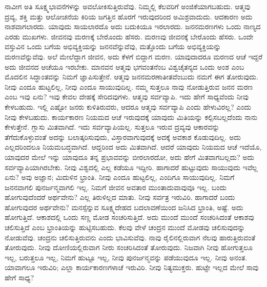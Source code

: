 ನಾವೀಗ ಅತಿ ಸೂಕ್ಷ್ಮಭಾವನೆಗಳನ್ನು ಅವಲೋಕಿಸುತ್ತಿರುವೆವು. ನಿಮ್ಮಲ್ಲಿ ಕೆಲವರಿಗೆ ಅಂಜಿಕೆಯಾಗಬಹುದು. ಆತ್ಮವು ದ್ರವ್ಯ, ಶಕ್ತಿ ಮತ್ತು ಆಲೋಚನೆಯ ಕಿರಿಯ ಜಗತ್ತಿನ ಹೊರಗೆ ಇರುವುದರಿಂದ ಅಮಿಶ್ರವಾದುದು. ಆದಕಾರಣ ಅದು ನಾಶವಾಗಲಾರದು. ಯಾವುದು ಸಾಯಲಾರದೊ ಅದು ಬದುಕಿಯೂ ಇರಲಾರದು. ಜನನಮರಣಗಳು ಒಂದು ನಾಣ್ಯದ ಎರಡು ಮುಖಗಳು. ಜೀವನವು ಮರಣಕ್ಕೆ ಬೇರೊಂದು ಹೆಸರು. ಮರಣವು ಜೀವನಕ್ಕೆ ಬೇರೊಂದು ಹೆಸರು. ಒಂದೇ ವಸ್ತುವಿನ ಒಂದು ಬಗೆಯ ಅಭಿವ್ಯಕ್ತಿಯನ್ನು ಜನನವೆನ್ನುವೆವು, ಮತ್ತೊಂದು ಬಗೆಯ ಅಭಿವ್ಯಕ್ತಿಯನ್ನು ಮರಣವೆನ್ನುವೆವು. ಅಲೆ ಮೇಲೆದ್ದಾಗ ಜೀವನ, ಅದು ಕೆಳಗೆ ಬಿದ್ದಾಗ ಮರಣ. ಯಾವುದಾದರೂ ಮರಣದ ಆಚೆ ಇದ್ದರೆ ಅದು ಜೀವನದ ಆಚೆಯೂ ಇರಬೇಕು. ಮಾನವನ ಆತ್ಮವು ಭಗವಂತನೆಂಬ ವಿಶ್ವಚೈತನ್ಯದ ಒಂದು ಅಂಶ ಎಂಬ ಮೊದಲಿನ ಸಿದ್ಧಾಂತವನ್ನು ನಿಮಗೆ ಜ್ಞಾಪಿಸುತ್ತೇನೆ. ಆತ್ಮವು ಜನನಮರಣಾತೀತವೆಂಬುದು ನಮಗೆ ಈಗ ತೋರುವುದು. ನೀವು ಎಂದೂ ಹುಟ್ಟಲಿಲ್ಲ, ನೀವು ಎಂದೂ ಸಾಯುವುದಿಲ್ಲ. ನಮ್ಮ ಸುತ್ತಲೂ ನಾವು ನೋಡುತ್ತಿರುವ ಜನನ ಮರಣ ಎಂಬ ಇವು ಏನು? ಇವು ಕೇವಲ ದೇಹಕ್ಕೆ ಸೇರಿದವುಗಳು. ಆತ್ಮವು ಸರ್ವವ್ಯಾಪಿ. ಇದು ಹೇಗೆ ಸಾಧ್ಯವೆಂದು ನೀವು ಕೇಳಬಹುದು. ಇಲ್ಲಿ ಎಷ್ಟೋ ಜನರು ಕುಳಿತಿರುವರು, ಆದರೂ ಆತ್ಮವು ಸರ್ವವ್ಯಾಪಿ ಎಂದು ಹೇಳುವಿರಲ್ಲ? ಎಂದು ನೀವು ಕೇಳಬಹುದು. ಕಾರ್ಯಕಾರಣ ನಿಯಮದ ಆಚೆ ಇರುವುದಕ್ಕೆ ಯಾವುದು ಮಿತಿಯನ್ನು ಕಲ್ಪಿಸಬಲ್ಲದೆಂದು ನಾನು ಕೇಳುತ್ತೇನೆ. ಗ್ಲಾಸು ಮಿತವಾಗಿದೆ. ಇದು ಸರ್ವವ್ಯಾಪಿಯಲ್ಲ. ಸುತ್ತಲೂ ಇರುವ ದ್ರವ್ಯವು ಆಕಾರವನ್ನು ತೆಗೆದುಕೊಳ್ಳುವಂತೆ ಅದನ್ನು ಬಲಾತ್ಕರಿಸುವುದು, ವಿಸ್ತಾರವಾಗುವುದಕ್ಕೆ ಅದಕ್ಕೆ ಅವಕಾಶ ಕೊಡುವುದಿಲ್ಲ. ಅದು ಎಲ್ಲದರಿಂದಲೂ ನಿಯಮಬದ್ಧವಾಗಿದೆ. ಆದ್ದರಿಂದ ಅದು ಮಿತವಾಗಿದೆ. ಆದರೆ ಯಾವುದು ನಿಯಮದ ಆಚೆ ಇದೆಯೊ, ಯಾವುದರ ಮೇಲೆ ಇನ್ನು ಯಾವುದೂ ತನ್ನ ಪ್ರಭಾವವನ್ನು ಬೀರಲಾರದೋ, ಅದು ಹೇಗೆ ಮಿತವಾಗಬಲ್ಲದು? ಅದು ಸರ್ವವ್ಯಾಪಿಯಾಗಿರಬೇಕು. ನೀವು ವಿಶ್ವದಲ್ಲಿ ಎಲ್ಲ ಕಡೆಯೂ ಇದ್ದೀರಿ. ಹಾಗಾದರೆ ಹುಟ್ಟುವುದು ಸಾಯುವುದು ಇವೆಲ್ಲ ಏನು? ಅವು ಅಜ್ಞಾನ; ಮಿದುಳಿನ ಭ್ರಾಂತಿ. ನೀವು ಎಂದೂ ಹುಟ್ಟಲಿಲ್ಲ, ಎಂದಿಗೂ ಸಾಯುವುದಿಲ್ಲ. ನಿಮಗೆ ಜನನವಾಗಲಿ ಪುನರ್ಜನ್ಮವಾಗಲಿ ಇಲ್ಲ. ನಿಮಗೆ ಜೀವನ ಅವತಾರ ಮುಂತಾದುವಾವುವೂ ಇಲ್ಲ. ಬಂದು ಹೋಗುವುದೆಂದರೆ ಅರ್ಥವೇನು? ಎಲ್ಲ ತಿರುಳಿಲ್ಲದ ಮಾತು. ನೀವು ಸರ್ವತ್ರ ಇರುವಿರಿ. ಹಾಗಾದರೆ ಬಂದು ಹೋಗುವುದರ ಅರ್ಥವೇನು? ಮನಸ್ಸೆನ್ನುವ ಸೂಕ್ಷ್ಮದೇಹದ ಬದಲಾವಣೆಯಿಂದ ಜನಿಸಿದ ಭ್ರಾಂತಿ, ಅಷ್ಟೆ. ಅದು ಹೋಗುತ್ತಿದೆ. ಆಕಾಶದಲ್ಲಿ ಒಂದು ಸಣ್ಣ ಮೋಡ ಸಂಚರಿಸುತ್ತಿದೆ. ಅದು ಮುಂದೆ ಮುಂದೆ ಸಂಚರಿಸಿದಂತೆ ಆಕಾಶವು ಚಲಿಸುತ್ತಿದೆ ಎಂಬ ಭ್ರಾಂತಿಯನ್ನು ಹುಟ್ಟಿಸಬಹುದು. ಕೆಲವು ವೇಳೆ ಚಂದ್ರನ ಮುಂದೆ ಮೋಡವು ಚಲಿಸುವುದನ್ನು ನೋಡುವೆವು. ಚಂದ್ರನು ಚಲಿಸುತ್ತಿರುವನು ಎಂದು ಭಾವಿಸುವೆವು. ನಾವು ರೈಲಿನಲ್ಲಿರುವಾಗ ನೆಲವು ಹಾರುತ್ತಿರುವಂತೆ ತೋರುವುದು. ನೀವು ದೋಣಿಯಲ್ಲಿರುವಾಗ ನೀರು ಸಂಚರಿಸಿದಂತೆ ತೋರುವುದು. ನಿಜವಾಗಿ ನೀವು ಹೋಗುತ್ತಲೂ ಇಲ್ಲ, ಬರುತ್ತಲೂ ಇಲ್ಲ, ನಿಮಗೆ ಹುಟ್ಟೂ ಇಲ್ಲ, ನೀವು ಪುನರ್ಜನ್ಮವನ್ನು ಪಡೆಯುವುದೂ ಇಲ್ಲ. ನೀವು ಅನಂತ. ಯಾವಾಗಲೂ ಇರುವಿರಿ; ಎಲ್ಲಾ ಕಾರ್ಯಕಾರಣಗಳಾಚೆ ಇರುವಿರಿ. ನೀವು 
ನಿತ್ಯಮುಕ್ತರು. ಹುಟ್ಟೇ ಇಲ್ಲದ ಮೇಲೆ ಸಾವು ಹೇಗೆ ಸಾಧ್ಯ?

\vskip 0.2cm

